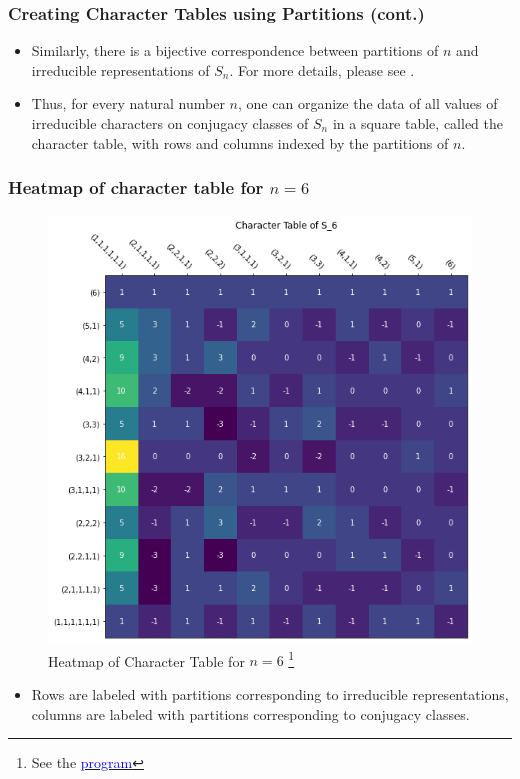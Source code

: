 \documentclass{beamer}
\begin{document}
\begin{frame}
\frametitle{Creating Character Tables using Partitions (cont.)}
\begin{itemize}
\item Similarly, there is a bijective correspondence between partitions of $n$ and irreducible representations of $S_{n}$. For more details, please see \cite{Zhao08youngta}.
    \item Thus, for every natural number $n$, one can organize the data of all values of irreducible characters on conjugacy classes of $S_{n}$ in a square table, called the character table, with rows and columns indexed by the partitions of $n$. 
\end{itemize}

\end{frame}

\begin{frame}
\frametitle{Heatmap of character table for $n=6$}

\begin{figure}[H]
  \centering
  \includegraphics[width=0.4\linewidth]{char_table_6_heatmap.png}
  \caption{Heatmap of Character Table for $n=6$ 
 \footnote{ \tiny See the \href{https://github.com/TonyZhang2004/Character_Table_of_Symmetric_Groups/blob/main/char_table.ipynb}{\textcolor{blue}{program}}}}
  \label{fig:char_6}
\end{figure}

\begin{itemize}
	\item Rows are labeled with partitions corresponding to irreducible representations, columns are labeled with partitions corresponding to conjugacy classes.
\end{itemize}

\end{frame}
\end{document}
